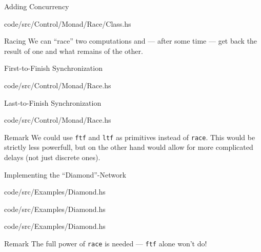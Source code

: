 ﻿\documentclass[aspectratio=169]{beamer}
\begin{document}
\begin{frame}{Adding Concurrency}
    
        {code/src/Control/Monad/Race/Class.hs}
    \begin{block}{Racing}
        We can ``race'' two computations and --- after some time ---
        get back the result of one and what remains of the other.
    \end{block}
\end{frame}

\begin{frame}{First-to-Finish Synchronization}
    
        {code/src/Control/Monad/Race.hs}
\end{frame}

\begin{frame}{Last-to-Finish Synchronization}
    
        {code/src/Control/Monad/Race.hs}
    \begin{block}{Remark}
        We could use {\tt ftf} and {\tt ltf} as primitives instead of
        {\tt race}. This would be strictly less powerfull, but on the other hand
        would allow for more complicated delays (not just discrete ones).
    \end{block}
\end{frame}

\begin{frame}{Implementing the ``Diamond''-Network}
    \begin{minipage}{0.7\textwidth}%
        \begin{overprint}
                
                    {code/src/Examples/Diamond.hs}
                
                    {code/src/Examples/Diamond.hs}
                
                    {code/src/Examples/Diamond.hs}
                \begin{block}{Remark}
                    The full power of {\tt race} is needed --- {\tt ftf}
                    alone won't do!
                \end{block}
        \end{overprint}
    \end{minipage}%
    \begin{minipage}{0.3\textwidth}%
        \centering
    \end{minipage}%
\end{frame}
\end{document}
